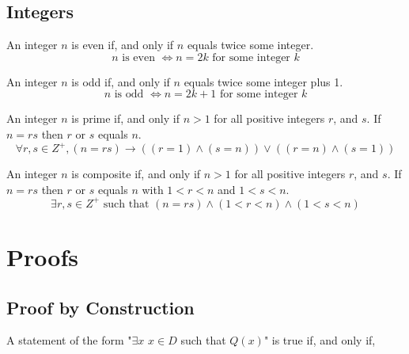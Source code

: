 \documentclass[11pt]{article}
\newcommand*\qstmt[3]{#1 $x \in #2$ such that #3}
\begin{document}
\subsection{Integers}

\begin{definition}[Even]\label{def:even}
    An integer $n$ is even if, and only if $n$ equals twice some integer.
    \begin{equation*}
        n \text{ is even } \iff n = 2k \text{ for some integer } k
    \end{equation*}
\end{definition}

\begin{definition}[Odd]\label{def:odd}
    An integer $n$ is odd if, and only if $n$ equals twice some integer plus 1.
    \begin{equation*}
        n \text{ is odd } \iff n = 2k + 1 \text{ for some integer } k
    \end{equation*}
\end{definition}

\begin{definition}[Prime]\label{def:prime}
    An integer $n$ is prime if, and only if $n > 1$ for all positive integers $r$, and $s$.
    If $n = rs$ then $r$ or $s$ equals $n$.
    \begin{equation*}
    \forall r,s \in Z^+, (n = rs) \to ((r = 1) \land (s = n)) \lor ((r = n) \land (s = 1))
    \end{equation*}
\end{definition}

\begin{definition}[Composite]\label{def:composite}
    An integer $n$ is composite if, and only if $n > 1$ for all positive integers $r$, and $s$.
    If $n = rs$ then $r$ or $s$ equals $n$ with $1 < r < n$ and $1 < s < n$.
    \begin{equation*}
        \exists r,s \in Z^+ \text{ such that } (n = rs) \land (1 < r < n) \land (1 < s < n)
    \end{equation*}
\end{definition}


\section{Proofs}

\subsection{Proof by Construction}
\begin{definition}\label{def:proof-by-construction}
    A statement of the form "\qstmt{$\exists x$ }{D}{$Q(x)$}" is true
    if, and only if,
\end{definition}
\end{document}
